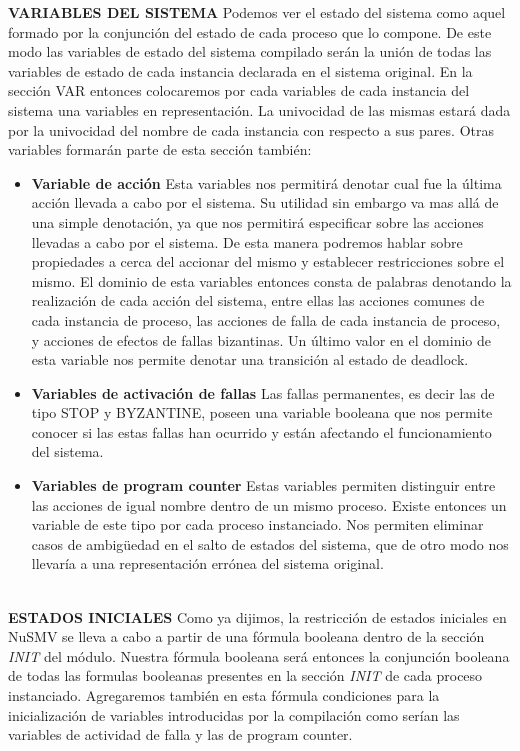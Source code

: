 \documentclass[titlepage, 12pt]{book}
\begin{document}
\textbf{VARIABLES DEL SISTEMA}
Podemos ver el estado del sistema como aquel formado por la conjunción del estado de cada proceso que lo compone. De este modo las variables de estado del sistema compilado serán la unión de todas las variables de estado de cada instancia declarada en el sistema original. En la sección VAR entonces colocaremos por cada variables de cada instancia del sistema una variables en representación. La univocidad de las mismas estará dada por la univocidad del nombre de cada instancia con respecto a sus pares. Otras variables formarán parte de esta sección también:
\begin{itemize}
\item \textbf{Variable de acción} Esta variables nos permitirá denotar cual fue la última acción llevada a cabo por el sistema. Su utilidad sin embargo va mas allá de una simple denotación, ya que nos permitirá especificar sobre las acciones llevadas a cabo por el sistema. De esta manera podremos hablar sobre propiedades a cerca del accionar del mismo y establecer restricciones sobre el mismo. El dominio de esta variables entonces consta de palabras denotando la realización de cada acción del sistema, entre ellas las acciones comunes de cada instancia de proceso, las acciones de falla de cada instancia de proceso, y acciones de efectos de fallas bizantinas. Un último valor en el dominio de esta variable nos permite denotar una transición al estado de deadlock.
\item \textbf{Variables de activación de fallas} Las fallas permanentes, es decir las de tipo STOP y BYZANTINE, poseen una variable booleana que nos permite conocer si las estas fallas han ocurrido y están afectando el funcionamiento del sistema.
\item \textbf{Variables de program counter} Estas variables permiten distinguir entre las acciones de igual nombre dentro de un mismo proceso. Existe entonces un variable de este tipo por cada proceso instanciado. Nos permiten eliminar casos de ambigüedad en el salto de estados del sistema, que de otro modo nos llevaría a una representación errónea del sistema original.
\end{itemize}
~\\

\textbf{ESTADOS INICIALES}
Como ya dijimos, la restricción de estados iniciales en NuSMV se lleva a cabo a partir de una fórmula booleana dentro de la sección \textit{INIT} del módulo. Nuestra fórmula booleana será entonces la conjunción booleana de todas las formulas booleanas presentes en la sección \textit{INIT} de cada proceso instanciado. Agregaremos también en esta fórmula condiciones para la inicialización de variables introducidas por la compilación como serían las variables de actividad de falla y las de program counter.\\
\end{document}
